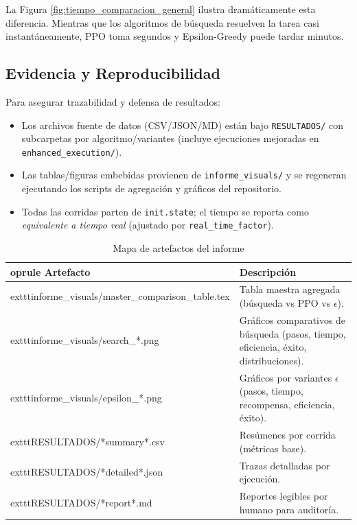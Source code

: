 \documentclass[12pt, oneside, openany]{book}
\begin{document}
La Figura \ref{fig:tiempo_comparacion_general} ilustra dramáticamente esta diferencia. Mientras que los algoritmos de búsqueda resuelven la tarea casi instantáneamente, PPO toma segundos y Epsilon-Greedy puede tardar minutos.

\subsection{Evidencia y Reproducibilidad}
Para asegurar trazabilidad y defensa de resultados:
\begin{itemize}
    \item Los archivos fuente de datos (CSV/JSON/MD) están bajo \texttt{RESULTADOS/} con subcarpetas por algoritmo/variantes (incluye ejecuciones mejoradas en \texttt{enhanced\_execution/}).
    \item Las tablas/figuras embebidas provienen de \texttt{informe\_visuals/} y se regeneran ejecutando los scripts de agregación y gráficos del repositorio.
    \item Todas las corridas parten de \texttt{init.state}; el tiempo se reporta como \emph{equivalente a tiempo real} (ajustado por \texttt{real\_time\_factor}).
\end{itemize}

\begin{table}[H]
    \centering
    \caption{Mapa de artefactos del informe}
    \label{tab:artefactos}
    \begin{tabular}{@{}lp{9.5cm}@{}}
        	oprule
        Artefacto & Descripción \\
        \midrule
        	exttt{informe\_visuals/master\_comparison\_table.tex} & Tabla maestra agregada (búsqueda vs PPO vs $\epsilon$). \\
        	exttt{informe\_visuals/search\_*.png} & Gráficos comparativos de búsqueda (pasos, tiempo, eficiencia, éxito, distribuciones). \\
        	exttt{informe\_visuals/epsilon\_*.png} & Gráficos por variantes $\epsilon$ (pasos, tiempo, recompensa, eficiencia, éxito). \\
        	exttt{RESULTADOS/*summary*.csv} & Resúmenes por corrida (métricas base). \\
        	exttt{RESULTADOS/*detailed*.json} & Trazas detalladas por ejecución. \\
        	exttt{RESULTADOS/*report*.md} & Reportes legibles por humano para auditoría. \\
        \bottomrule
    \end{tabular}
\end{table}
\end{document}
